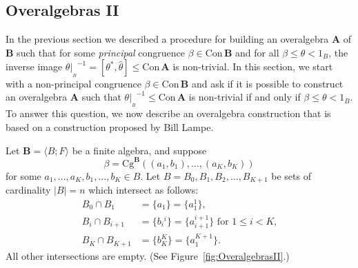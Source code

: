 \documentclass[cm,dissertation]{uhthesis}
\theoremstyle{plain}
\theoremstyle{definition}
\theoremstyle{remark}
\numberwithin{theorem}{section}
\numberwithin{claim}{chapter}
\numberwithin{equation}{section}
\numberwithin{conjecture}{chapter}
\newcommand{\<}{\ensuremath{\langle}}
\renewcommand{\>}{\ensuremath{\rangle}}
\renewcommand{\leq}{\ensuremath{\leqslant}}
\newcommand{\Cg}{\ensuremath{\mathrm{Cg}}}
\newcommand{\Con}{\ensuremath{\mathrm{Con\,}}}
\newcommand{\supi}{\ensuremath{^{i}}}
\newcommand{\0}{\ensuremath{\mathbf{0}}}
\newcommand{\1}{\ensuremath{\mathbf{1}}}
\newcommand{\2}{\ensuremath{\mathbf{2}}}
\newcommand{\3}{\ensuremath{\mathbf{3}}}
\newcommand{\4}{\ensuremath{\mathbf{4}}}
\newcommand{\5}{\ensuremath{\mathbf{5}}}
\newcommand{\bA}{\ensuremath{\mathbf{A}}}
\newcommand{\bB}{\ensuremath{\mathbf{B}}}
\newcommand{\resB}{\ensuremath{|_{_B}}}
\begin{document}
\subsection{Overalgebras II}
\label{sec:overalgebras-ii}
In the previous section we described a procedure for building an
overalgebra $\bA$ of $\bB$ such that for some 
\emph{principal} congruence $\beta\in \Con\bB$ and for all 
$\beta \leq \theta < 1_B$, the inverse image $\theta \resB^{-1} = [\theta^*,
  \widehat{\theta}] \leq \Con\bA$ is non-trivial.
In this section, we start with a non-principal congruence $\beta\in \Con\bB$ and
ask if it is possible to construct an overalgebra $\bA$ such that 
$\theta\resB^{-1}\leq \Con\bA$ is non-trivial if and only if 
$\beta \leq \theta < 1_B$.  
To answer this question, we now describe an overalgebra construction that is
based on a construction proposed by Bill Lampe.

Let $\bB = \<B; F\>$ be a finite algebra, and suppose 
\[
\beta = \Cg^{\bB}((a_1, b_1), \dots, (a_K,b_K))
\]
for some $a_1, \dots, a_K, b_1, \dots, b_K \in B$.
Let $B=B_0, B_1, B_2, \dots, B_{K+1}$ be sets of cardinality $|B| = n$
which intersect as follows: 
\begin{align*}
  B_0\cap B_1 &=\{a_1\}=\{a_1^{1}\},\\
  B_i \cap B_{i+1} &= \{b_i\supi\}=\{a^{i+1}_{i+1}\} \text{ for $1\leq i < K$,}\\
  B_K\cap B_{K+1}&=\{b^{K}_K\}=\{a_1^{K+1}\}.
\end{align*}
All other intersections are empty. (See Figure~\ref{fig:OveralgebrasII}.)
\end{document}
